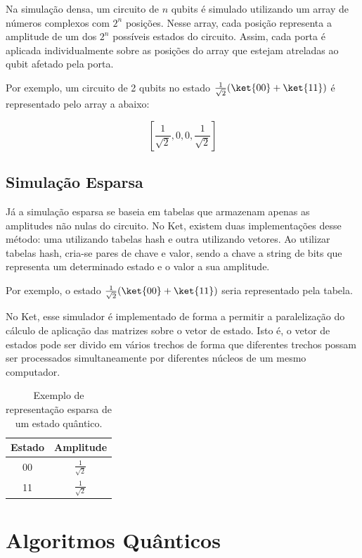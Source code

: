 Na simulação densa, um circuito de $n$ qubits é simulado utilizando um array de números complexos com $2^n$ posições. Nesse array, cada posição representa a amplitude de um dos $2^n$ possíveis estados do circuito. Assim, cada porta é aplicada individualmente sobre as posições do array que estejam atreladas ao qubit afetado pela porta.

Por exemplo, um circuito de 2 qubits no estado $\frac{1}{\sqrt{2}}(\ket{00} + \ket{11})$ é representado pelo array a abaixo:

\[
[\frac{1}{\sqrt{2}}, 0, 0, \frac{1}{\sqrt{2}}]
\]

\subsection{Simulação Esparsa}\label{sub:sparse}

Já a simulação esparsa se baseia em tabelas que armazenam apenas as amplitudes não nulas do circuito. No Ket, existem duas implementações desse método: uma utilizando tabelas hash e outra utilizando vetores. Ao utilizar tabelas hash, cria-se pares de chave e valor, sendo a chave a string de bits que representa um determinado estado e o valor a sua amplitude. 

Por exemplo, o estado $\frac{1}{\sqrt{2}}(\ket{00} + \ket{11})$ seria representado pela tabela.

No Ket, esse simulador é implementado de forma a permitir a paralelização do cálculo de aplicação das matrizes sobre o vetor de estado. Isto é, o vetor de estados pode ser divido em vários trechos de forma que diferentes trechos possam ser processados simultaneamente por diferentes núcleos de um mesmo computador.

\begin{table}[H]
  \centering
  \begin{tabular}{|c|c|}
    \hline
    Estado & Amplitude \\
    \hline
    00 & $\frac{1}{\sqrt{2}}$ \\
    11 & $\frac{1}{\sqrt{2}}$ \\
    \hline
  \end{tabular}
  \caption{Exemplo de representação esparsa de um estado quântico.}
  \label{tab:sparse-state-example}
\end{table}

\section{Algoritmos Quânticos}\label{sec:quantum_algorithms}

